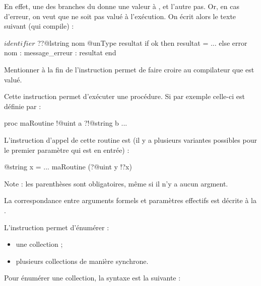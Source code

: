 {En effet, une des branches du  donne une valeur à , et l'autre pas. Or, en cas d'erreur, on veut que  ne soit pas valué à l'exécution. On écrit alors le texte suivant (qui compile) :
\begin{galgascode}
$identifier$ ??@lstring nom
@unType resultat
if ok then
  resultat = ...
else
  error nom : message_erreur : resultat
end
\end{galgascode}

Mentionner  à la fin de l'instruction  permet de faire croire au compilateur que  est valué.




Cette instruction permet d'exécuter une procédure. Si par exemple celle-ci est définie par :
\begin{galgascode}
proc maRoutine !@uint a ?!@string b {
  ...
}
\end{galgascode}

L'instruction d'appel de cette routine est (il y a plusieurs variantes possibles pour le premier paramètre qui est en entrée) :
\begin{galgascode}
@string x = ...
maRoutine (?@uint y !?x)
\end{galgascode}

Note : les parenthèses sont obligatoires, même si il n'y a aucun argment.

La correspondance entre arguments formels et paramètres effectifs est décrite à la .





L'instruction  permet d'énumérer :
\begin{itemize}
  \item une collection ;
  \item plusieurs collections de manière synchrone.
\end{itemize}

Pour énumérer une collection, la syntaxe est la suivante :

}
